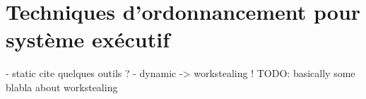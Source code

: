 \section{Techniques d'ordonnancement pour système exécutif}\label{sec:context:runtimes}

 - static
 cite quelques outils ?
 - dynamic
 -> workstealing !
TODO: basically some blabla about workstealing


